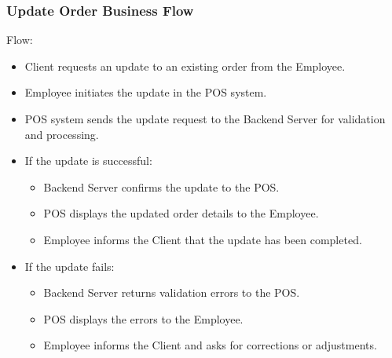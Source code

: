 \documentclass[]{VUMIFTemplateClass}
\begin{document}
\subsubsection{Update Order Business Flow}

Flow:
\begin{itemize}
\setlength{\itemsep}{2pt}
\setlength{\parskip}{0pt}
\setlength{\parsep}{0pt}
\item Client requests an update to an existing order from the Employee.
\item Employee initiates the update in the POS system.
\item POS system sends the update request to the Backend Server for validation and processing.
\item If the update is successful:
\begin{itemize}
\item Backend Server confirms the update to the POS.
\item POS displays the updated order details to the Employee.
\item Employee informs the Client that the update has been completed.
\end{itemize}
\item If the update fails:
\begin{itemize}
\item Backend Server returns validation errors to the POS.
\item POS displays the errors to the Employee.
\item Employee informs the Client and asks for corrections or adjustments.
\end{itemize}
\end{itemize}
\end{document}
